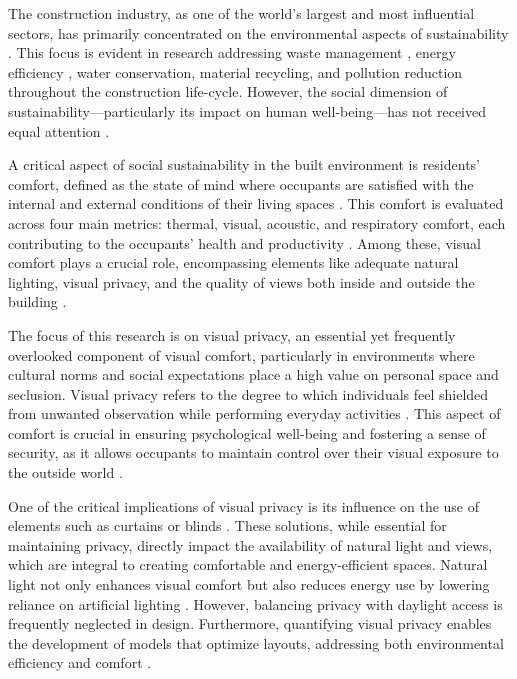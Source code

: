 \documentclass[final,3p,times,review]{elsarticle}
\begin{document}
The construction industry, as one of the world's largest and most influential sectors, has primarily concentrated on the environmental aspects of sustainability \cite{lima2021}. This focus is evident in research addressing waste management \cite{negash2021}, energy efficiency \cite{mousavi2023}, water conservation\cite{arman2021}, material recycling, and pollution reduction throughout the construction life-cycle. However, the social dimension of sustainability—particularly its impact on human well-being—has not received equal attention \cite{debrah2022}.

A critical aspect of social sustainability in the built environment is residents’ comfort, defined as the state of mind where occupants are satisfied with the internal and external conditions of their living spaces \cite{yildiz2020}. This comfort is evaluated across four main metrics: thermal, visual, acoustic, and respiratory comfort, each contributing to the occupants' health and productivity \cite{faraji2023}. Among these, visual comfort plays a crucial role, encompassing elements like adequate natural lighting, visual privacy, and the quality of views both inside and outside the building \cite{abd2023}.

The focus of this research is on visual privacy, an essential yet frequently overlooked component of visual comfort, particularly in environments where cultural norms and social expectations place a high value on personal space and seclusion. Visual privacy refers to the degree to which individuals feel shielded from unwanted observation while performing everyday activities \cite{lis2021}. This aspect of comfort is crucial in ensuring psychological well-being and fostering a sense of security, as it allows occupants to maintain control over their visual exposure to the outside world \cite{ mansor2020}. 

One of the critical implications of visual privacy is its influence on the use of elements such as curtains or blinds \cite{elgadra2023}. These solutions, while essential for maintaining privacy, directly impact the availability of natural light and views, which are integral to creating comfortable and energy-efficient spaces. Natural light not only enhances visual comfort but also reduces energy use by lowering reliance on artificial lighting \cite{gago2015}. However, balancing privacy with daylight access is frequently neglected in design. Furthermore, quantifying visual privacy enables the development of models that optimize layouts, addressing both environmental efficiency and comfort \cite{elbatran2021,bahdad2021,khani2022,lotfabadi2023}.
\end{document}

